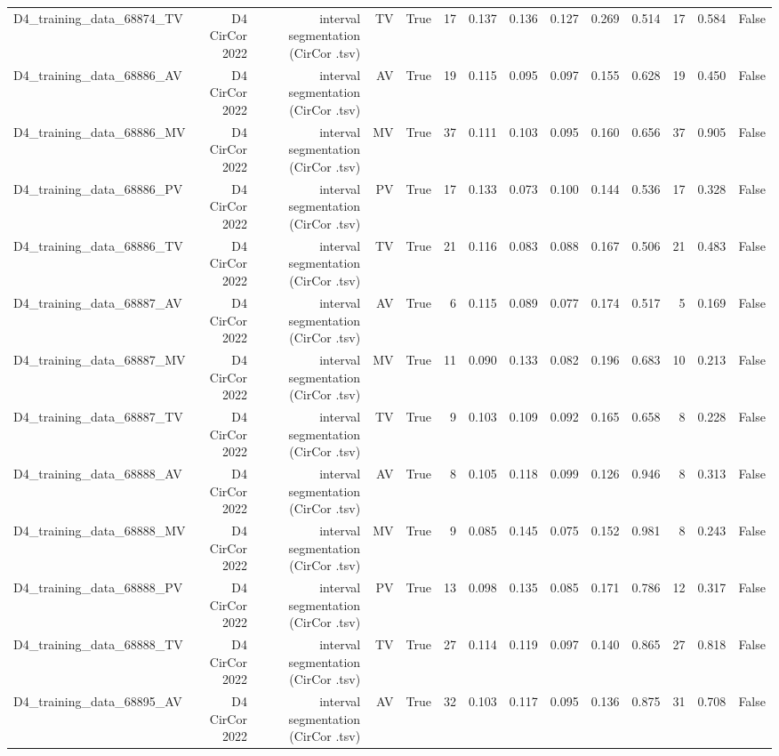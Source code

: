 \begin{table}[htbp]
\begin{tabular}{lrrrrrrrrrrrrr}
    D4\_training\_data\_68874\_TV & D4 CirCor 2022 & interval segmentation (CirCor .tsv) & TV & True & 17 & 0.137 & 0.136 & 0.127 & 0.269 & 0.514 & 17 & 0.584 & False \\
    D4\_training\_data\_68886\_AV & D4 CirCor 2022 & interval segmentation (CirCor .tsv) & AV & True & 19 & 0.115 & 0.095 & 0.097 & 0.155 & 0.628 & 19 & 0.450 & False \\
    D4\_training\_data\_68886\_MV & D4 CirCor 2022 & interval segmentation (CirCor .tsv) & MV & True & 37 & 0.111 & 0.103 & 0.095 & 0.160 & 0.656 & 37 & 0.905 & False \\
    D4\_training\_data\_68886\_PV & D4 CirCor 2022 & interval segmentation (CirCor .tsv) & PV & True & 17 & 0.133 & 0.073 & 0.100 & 0.144 & 0.536 & 17 & 0.328 & False \\
    D4\_training\_data\_68886\_TV & D4 CirCor 2022 & interval segmentation (CirCor .tsv) & TV & True & 21 & 0.116 & 0.083 & 0.088 & 0.167 & 0.506 & 21 & 0.483 & False \\
    D4\_training\_data\_68887\_AV & D4 CirCor 2022 & interval segmentation (CirCor .tsv) & AV & True & 6 & 0.115 & 0.089 & 0.077 & 0.174 & 0.517 & 5 & 0.169 & False \\
    D4\_training\_data\_68887\_MV & D4 CirCor 2022 & interval segmentation (CirCor .tsv) & MV & True & 11 & 0.090 & 0.133 & 0.082 & 0.196 & 0.683 & 10 & 0.213 & False \\
    D4\_training\_data\_68887\_TV & D4 CirCor 2022 & interval segmentation (CirCor .tsv) & TV & True & 9 & 0.103 & 0.109 & 0.092 & 0.165 & 0.658 & 8 & 0.228 & False \\
    D4\_training\_data\_68888\_AV & D4 CirCor 2022 & interval segmentation (CirCor .tsv) & AV & True & 8 & 0.105 & 0.118 & 0.099 & 0.126 & 0.946 & 8 & 0.313 & False \\
    D4\_training\_data\_68888\_MV & D4 CirCor 2022 & interval segmentation (CirCor .tsv) & MV & True & 9 & 0.085 & 0.145 & 0.075 & 0.152 & 0.981 & 8 & 0.243 & False \\
    D4\_training\_data\_68888\_PV & D4 CirCor 2022 & interval segmentation (CirCor .tsv) & PV & True & 13 & 0.098 & 0.135 & 0.085 & 0.171 & 0.786 & 12 & 0.317 & False \\
    D4\_training\_data\_68888\_TV & D4 CirCor 2022 & interval segmentation (CirCor .tsv) & TV & True & 27 & 0.114 & 0.119 & 0.097 & 0.140 & 0.865 & 27 & 0.818 & False \\
    D4\_training\_data\_68895\_AV & D4 CirCor 2022 & interval segmentation (CirCor .tsv) & AV & True & 32 & 0.103 & 0.117 & 0.095 & 0.136 & 0.875 & 31 & 0.708 & False \\

\end{tabular}
\end{table}
